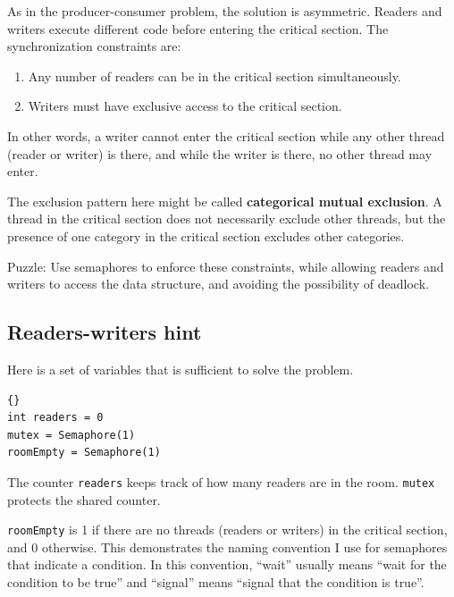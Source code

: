 \documentclass{book}
\newcommand{\clearemptydoublepage}{\newpage\cleardoublepage}
\begin{document}
As in the producer-consumer problem, the solution is asymmetric.
Readers and writers execute different code before entering the
critical section.  The synchronization constraints are:

\begin{enumerate}

\item Any number of readers can be in the critical section
simultaneously.

\item Writers must have exclusive access to the critical section.

\end{enumerate}

In other words, a writer cannot enter the critical section while
any other thread (reader or writer) is there, and while the writer
is there, no other thread may enter.

The exclusion pattern here might be called {\bf categorical
mutual exclusion}.  A thread in the critical section
does not necessarily exclude other threads, but the presence
of one category in the critical section excludes other
categories.

Puzzle: Use semaphores to enforce these constraints, while allowing
readers and writers to access the data structure, and avoiding
the possibility of deadlock.


\clearemptydoublepage
\subsection{Readers-writers hint}

Here is a set of variables that is sufficient to solve the
problem.

\begin{latin}
\begin{latin}
\begin{lstlisting}[title={Readers-writers initialization}]{}
int readers = 0
mutex = Semaphore(1)
roomEmpty = Semaphore(1)
\end{lstlisting}
\end{latin}
\end{latin}

The counter {\tt readers} keeps track of how many readers
are in the room.  {\tt mutex} protects the shared counter.

{\tt roomEmpty} is 1 if there are no threads (readers or writers) in
the critical section, and 0 otherwise.  This demonstrates the naming
convention I use for semaphores that indicate a condition.  In
this convention, ``wait'' usually means ``wait for the condition to
be true'' and ``signal'' means ``signal that the condition is true''.
\end{document}
